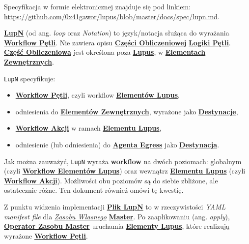 \label{appendix:3}

Specyfikacja w formie elektronicznej znajduje się pod linkiem: \url{https://github.com/0x41gawor/lupus/blob/master/docs/spec/lupn.md}.


\hyperlink{def:lupn}{\textbf{LupN}} (od ang. \textit{loop} oraz \textit{Notation}) to język/notacja służąca do wyrażania \hyperlink{def:workflow-petli}{\textbf{Workflow Pętli}}. Nie zawiera opisu \hyperlink{def:czesc-obliczeniowa}{\textbf{Części Obliczeniowej}} \hyperlink{def:logika-petli}{\textbf{Logiki Pętli}}. \hyperlink{def:czesc-obliczeniowa}{\textbf{Część Obliczeniowa}} jest określona poza \hyperlink{def:lupus}{\textbf{Lupus}}, w \hyperlink{def:element-zewnetrzny}{\textbf{Elementach Zewnętrznych}}.

\texttt{LupN} specyfikuje:
\begin{itemize}
    \item \hyperlink{def:workflow-petli}{\textbf{Workflow Pętli}}, czyli workflow \hyperlink{def:element-lupus}{\textbf{Elementów Lupus}},
    \item odniesienia do \hyperlink{def:element-zewnetrzny}{\textbf{Elementów Zewnętrznych}}, wyrażone jako \hyperlink{def:destynacja}{\textbf{Destynacje}},
    \item \hyperlink{def:workflow-petli}{\textbf{Workflow Akcji}} w ramach \hyperlink{def:element-lupus}{\textbf{Elementu Lupus}},
    \item odniesienie (lub odniesienia) do \hyperlink{def:agent-egress}{\textbf{Agenta Egress}} jako \hyperlink{def:destynacja}{\textbf{Destynacja}}.
\end{itemize}

Jak można zauważyć, \texttt{LupN} wyraża \textbf{workflow} na dwóch poziomach: globalnym (czyli \hyperlink{def:workflow-petli}{\textbf{Workflow Elementów Lupus}}) oraz wewnątrz \hyperlink{def:element-lupus}{\textbf{Elementu Lupus}} (czyli \hyperlink{def:workflow-petli}{\textbf{Workflow Akcji}}). Możliwości obu poziomów są do siebie zbliżone, ale ostatecznie różne. Ten dokument również omówi tę kwestię.


Z punktu widzenia implementacji \hyperlink{def:plik-lupn}{\textbf{Plik LupN}} to w rzeczywistości \textit{YAML manifest file} dla \hyperlink{def:zasoby-wlasne}{\textit{Zasobu Własnego}} \hyperlink{def:master}{\textbf{Master}}. Po zaaplikowaniu (ang. \textit{apply}), \hyperlink{def:operator-zasobu-master}{\textbf{Operator Zasobu Master}} uruchamia \hyperlink{def:element-lupus}{\textbf{Elementy Lupus}}, które realizują wyrażone \hyperlink{def:workflow-petli}{\textbf{Workflow Pętli}}.

